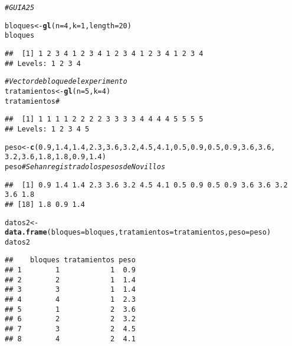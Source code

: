 \documentclass{article}\usepackage[]{graphicx}\usepackage[]{color}
\makeatletter
\newcommand{\hlnum}[1]{\textcolor[rgb]{0.686,0.059,0.569}{#1}}%
\newcommand{\hlcom}[1]{\textcolor[rgb]{0.678,0.584,0.686}{\textit{#1}}}%
\newcommand{\hlstd}[1]{\textcolor[rgb]{0.345,0.345,0.345}{#1}}%
\newcommand{\hlkwb}[1]{\textcolor[rgb]{0.69,0.353,0.396}{#1}}%
\newcommand{\hlkwc}[1]{\textcolor[rgb]{0.333,0.667,0.333}{#1}}%
\newcommand{\hlkwd}[1]{\textcolor[rgb]{0.737,0.353,0.396}{\textbf{#1}}}%
\newenvironment{kframe}{%
 \def\at@end@of@kframe{}%
 \ifinner\ifhmode%
  \def\at@end@of@kframe{\end{minipage}}%
  \begin{minipage}{\columnwidth}%
 \fi\fi%
 \def\FrameCommand##1{\hskip\@totalleftmargin \hskip-\fboxsep
 \colorbox{shadecolor}{##1}\hskip-\fboxsep
     \hskip-\linewidth \hskip-\@totalleftmargin \hskip\columnwidth}%
 \MakeFramed {\advance\hsize-\width
   \@totalleftmargin\z@ \linewidth\hsize
   \@setminipage}}%
 {\par\unskip\endMakeFramed%
 \at@end@of@kframe}
\newenvironment{knitrout}{}{} %
\makeatother
\begin{document}
\begin{knitrout}
\color{fgcolor}\begin{kframe}
\begin{alltt}
\hlcom{# GUIA 25}

\hlstd{bloques}\hlkwb{<-}\hlkwd{gl}\hlstd{(}\hlkwc{n}\hlstd{=}\hlnum{4}\hlstd{,}\hlkwc{k}\hlstd{=}\hlnum{1}\hlstd{,}\hlkwc{length} \hlstd{=} \hlnum{20}\hlstd{)}
\hlstd{bloques}
\end{alltt}
\begin{verbatim}
##  [1] 1 2 3 4 1 2 3 4 1 2 3 4 1 2 3 4 1 2 3 4
## Levels: 1 2 3 4
\end{verbatim}
\begin{alltt}
\hlcom{# Vector de bloque del experimento}
\hlstd{tratamientos}\hlkwb{<-}\hlkwd{gl}\hlstd{(}\hlkwc{n}\hlstd{=}\hlnum{5}\hlstd{,}\hlkwc{k}\hlstd{=}\hlnum{4}\hlstd{)}
\hlstd{tratamientos} \hlcom{# }
\end{alltt}
\begin{verbatim}
##  [1] 1 1 1 1 2 2 2 2 3 3 3 3 4 4 4 4 5 5 5 5
## Levels: 1 2 3 4 5
\end{verbatim}
\begin{alltt}
\hlstd{peso}\hlkwb{<-}\hlkwd{c}\hlstd{(}\hlnum{0.9}\hlstd{,}\hlnum{1.4}\hlstd{,}\hlnum{1.4}\hlstd{,}\hlnum{2.3}\hlstd{,}\hlnum{3.6}\hlstd{,}\hlnum{3.2}\hlstd{,}\hlnum{4.5}\hlstd{,}\hlnum{4.1}\hlstd{,}\hlnum{0.5}\hlstd{,}\hlnum{0.9}\hlstd{,}\hlnum{0.5}\hlstd{,}\hlnum{0.9}\hlstd{,}\hlnum{3.6}\hlstd{,}\hlnum{3.6}\hlstd{,}
        \hlnum{3.2}\hlstd{,}\hlnum{3.6}\hlstd{,}\hlnum{1.8}\hlstd{,}\hlnum{1.8}\hlstd{,}\hlnum{0.9}\hlstd{,}\hlnum{1.4}\hlstd{)}
\hlstd{peso} \hlcom{# Se han registrado los pesos de Novillos}
\end{alltt}
\begin{verbatim}
##  [1] 0.9 1.4 1.4 2.3 3.6 3.2 4.5 4.1 0.5 0.9 0.5 0.9 3.6 3.6 3.2 3.6 1.8
## [18] 1.8 0.9 1.4
\end{verbatim}
\begin{alltt}
\hlstd{datos2}\hlkwb{<-}\hlkwd{data.frame}\hlstd{(}\hlkwc{bloques}\hlstd{=bloques,}\hlkwc{tratamientos}\hlstd{=tratamientos,}\hlkwc{peso}\hlstd{=peso)}
\hlstd{datos2}
\end{alltt}
\begin{verbatim}
##    bloques tratamientos peso
## 1        1            1  0.9
## 2        2            1  1.4
## 3        3            1  1.4
## 4        4            1  2.3
## 5        1            2  3.6
## 6        2            2  3.2
## 7        3            2  4.5
## 8        4            2  4.1

\end{verbatim}
\end{kframe}
\end{knitrout}
\end{document}
